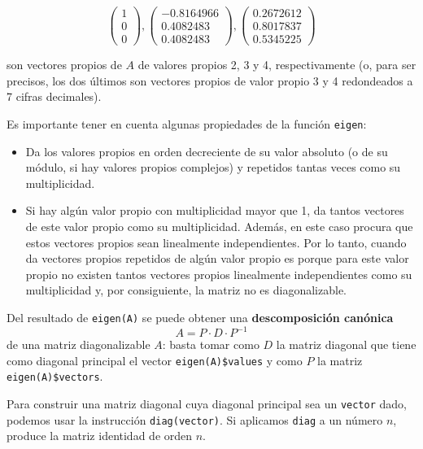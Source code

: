 \documentclass[
]{book}
\theoremstyle{definition}
\theoremstyle{definition}
\theoremstyle{definition}
\theoremstyle{remark}
\begin{document}
\[
\left(\begin{array}{c} 1 \\ 0 \\ 0\end{array}\right),
\left(\begin{array}{c} -0.8164966 \\ 0.4082483 \\ 0.4082483\end{array}\right),
\left(\begin{array}{c} 0.2672612 \\ 0.8017837 \\ 0.5345225\end{array}\right)
\]

son vectores propios de \(A\) de valores propios 2, 3 y 4, respectivamente (o, para ser precisos, los dos últimos son vectores propios de valor propio 3 y 4 redondeados a 7 cifras decimales).

Es importante tener en cuenta algunas propiedades de la función \texttt{eigen}:

\begin{itemize}
\item
  Da los valores propios en orden decreciente de su valor absoluto (o de su módulo, si hay valores propios complejos) y repetidos tantas veces como su multiplicidad.
\item
  Si hay algún valor propio con multiplicidad mayor que 1, da tantos vectores de este valor propio como su multiplicidad. Además, en este caso procura que estos vectores propios sean linealmente independientes. Por lo tanto, cuando da vectores propios repetidos de algún valor propio es porque para este valor propio no existen tantos vectores propios linealmente independientes como su multiplicidad y, por consiguiente, la matriz no es diagonalizable.
\end{itemize}

Del resultado de \texttt{eigen(A)} se puede obtener una \textbf{descomposición canónica}
\[
A= P\cdot D\cdot P^{-1}
\]
de una matriz diagonalizable \(A\): basta tomar como \(D\) la matriz diagonal que tiene como diagonal principal el vector \texttt{eigen(A)\$values} y como \(P\) la matriz \texttt{eigen(A)\$vectors}.

Para construir una matriz diagonal cuya diagonal principal sea un \texttt{vector} dado, podemos usar la instrucción \texttt{diag(vector)}. Si aplicamos \texttt{diag} a un número \(n\), produce la matriz identidad de orden \(n\).
\end{document}
